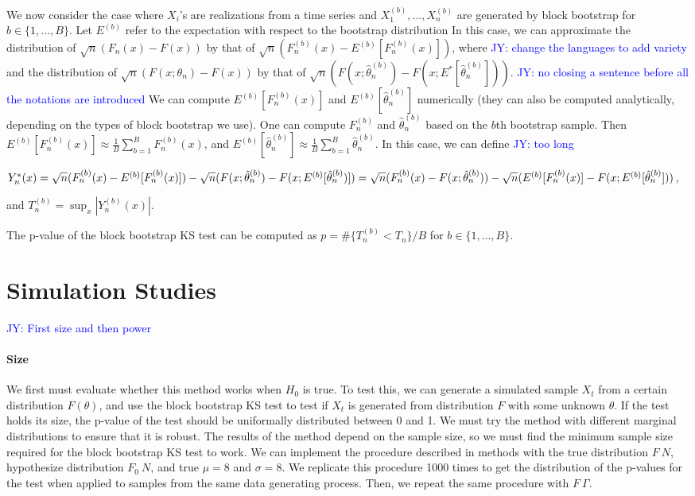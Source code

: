 \documentclass[12pt, letterpaper]{article}
\newcommand{\jy}[1]{\textcolor{blue}{JY: #1}}
\begin{document}
We now consider the case where $X_i$'s are realizations from a time series and
$X^{(b)}_1,...,X^{(b)}_n$ are generated by block bootstrap for 
$b \in \{1, \ldots, B\}$. Let $E^{(b)}$ refer to the expectation with respect to
the bootstrap distribution
In this case, we can 
approximate the distribution of
$\sqrt{n}(F_n(x) - F(x))$
by that of
$\sqrt{n}(F^{(b)}_n(x) - E^{(b)}[F^{(b)}_n(x)])$,
where 
\jy{change the languages to add variety}
and the distribution of $\sqrt{n}(F(x; \theta_n) - F(x))$
by that of $\sqrt{n}(F(x; \hat\theta^{(b)}_n) - F(x; E^*[\hat\theta^{(b)}_n]))$.
\jy{no closing a sentence before all the notations are introduced}
We can compute $E^{(b)}[F^{(b)}_n(x)]$ and 
$E^{(b)}[\hat\theta^{(b)}_n]$ numerically (they can also be computed analytically, 
depending on the types of block bootstrap we use). One can compute 
$F^{(b)}_n$ 
and $\hat\theta^{(b)}_n$ based on
the $b$th bootstrap sample. Then
$E^{(b)}[F^{(b)}_n(x)] \approx \frac{1}{B}\sum_{b = 1}^BF^{(b)}_n(x)$, and
$E^{(b)}[\hat\theta^{(b)}_n] \approx \frac{1}{B}\sum_{b = 1}^B\hat\theta^{(b)}_n$.
In this case, we can define
\jy{too long}


$Y^*_n(x) = \sqrt{n}(F^{(b)}_n(x) - E^{(b)}[F^{(b)}_n(x)]) - 
\sqrt{n}(F(x; \hat\theta^{(b)}_n) - F(x; E^{(b)}[\hat\theta^{(b)}_n)]) \\
= \sqrt{n}(F^{(b)}_n(x) - F(x; \hat\theta^{(b)}_n)) - 
\sqrt{n}(E^{(b)}[F^{(b)}_n(x)] - F(x; E^{(b)}[\hat\theta^{(b)}_n]))$,


and $T^{(b)}_n = \sup_x|Y^{(b)}_n(x)|$.

The p-value of the block bootstrap KS test can be computed 
as $p = \#\{T^{(b)}_n < T_n\} / B$ for 
$b \in \{1, \ldots, B\}$.

\section{Simulation Studies}
\label{sec:simu}

\jy{First size and then power}

\paragraph{Size}
We first must evaluate whether this method works when $H_0$ is true. To
test this, we can
generate a simulated sample $X_t$ from a certain distribution $F(\theta)$,
and use the block bootstrap KS test to test if $X_t$ is generated from 
distribution $F$ with some unknown $\theta$. If the test holds its size, the 
p-value
of the test should be uniformally distributed between 0 and 1. We must try the
method with different marginal distributions to ensure that it is robust.
The results of the method depend on the sample size, so we must find the minimum
sample size required for the block bootstrap KS test to work.
We can implement the procedure described in methods with the true distribution
$F ~ N$, hypothesize distribution $F_0 ~ N$, and true $\mu = 8$ and 
$\sigma = 8$.
We replicate this procedure 1000 times to get the distribution of the p-values 
for the test when applied to samples from the same data generating process.
Then, we repeat the same procedure with $F ~ \Gamma$.
\end{document}
